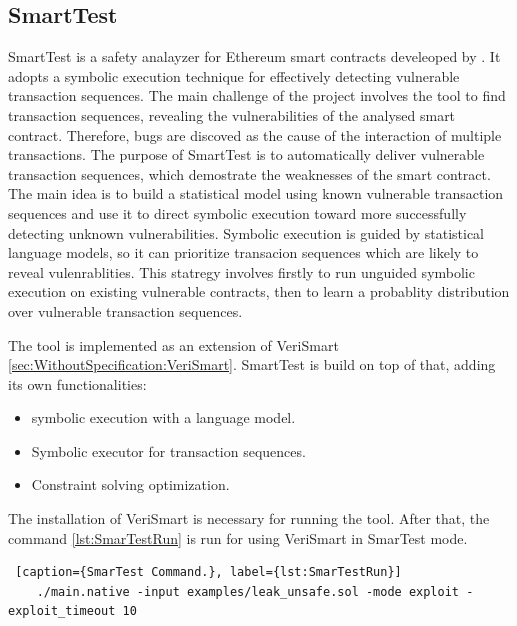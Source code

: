 \subsection{SmartTest}
\label{sec:WithoutSpecification:SmartTest}

SmartTest is a safety analayzer for Ethereum smart contracts develeoped by \citet{SmarTest}. 
It adopts a symbolic execution technique for effectively detecting vulnerable transaction sequences. 
The main challenge of the project involves the tool to find transaction sequences,
revealing the vulnerabilities of the analysed smart contract. Therefore, bugs are discoved as the cause of the interaction of multiple transactions.
The purpose of SmartTest is to automatically deliver vulnerable transaction sequences, 
which demostrate the weaknesses of the smart contract.
The main idea is to build a statistical model using known vulnerable transaction sequences and use it to direct symbolic execution toward 
more successfully detecting unknown vulnerabilities. 
Symbolic execution is guided by statistical language models, so it can prioritize transacion sequences which are likely to reveal vulenrablities.
This statregy involves firstly to run unguided symbolic
execution on existing vulnerable contracts, then to learn a probablity distribution over vulnerable transaction sequences.

The tool is implemented as an extension of VeriSmart \autoref{sec:WithoutSpecification:VeriSmart}.
SmartTest is build on top of that, adding its own functionalities:
\begin{itemize}
    \item symbolic execution with a language model.
    \item Symbolic executor for transaction sequences.
    \item Constraint solving optimization.
\end{itemize}
The installation of VeriSmart is necessary for running the tool. After that, the command \autoref{lst:SmarTestRun} is run for using VeriSmart in SmarTest mode.
\begin{lstlisting} [caption={SmarTest Command.}, label={lst:SmarTestRun}]
    ./main.native -input examples/leak_unsafe.sol -mode exploit -exploit_timeout 10
\end{lstlisting}


